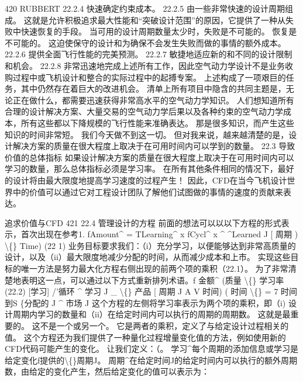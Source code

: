 \documentclass[UTF8,11pt,a4paper,openany,fontset=fandol]{ctexbook}
\begin{document}
420 RUBBERT 22.2.4 快速确定约束成本。 22.2.5 由一些非常快速的设计周期组成。 这就是允许积极追求最大性能和“突破设计范围”的原因，它提供了一种从失败中快速恢复的手段。 当可用的设计周期数量太少时，失败是不可能的。 恢复是不可能的。 这迫使保守的设计和为确保不会发生失败而做的事情的额外成本。 22.2.6 提供全面飞行性能的完美预测。 22.2.7 敏捷地适应新的和不同的设计限制和机会。 22.2.8 非常迅速地完成上述所有工作，因此空气动力学设计不是业务收购过程中或飞机设计和整合的实际过程中的起搏专案。 上述构成了一项艰巨的任务，其中仍然存在着巨大的改进机会。 清单上所有项目中隐含的共同主题是，无论正在做什么，都需要迅速获得非常高水平的空气动力学知识。 人们想知道所有合理的设计解决方案、大量交易的空气动力学后果以及各种约束的空气动力学成本，所有这些都以下降规模的飞行性能来准确表达。 那是很多知识，而产生这些知识的时间非常短。 我们今天做不到这一切。 但对我来说，越来越清楚的是，设计解决方案的质量在很大程度上取决于在可用时间内可以学到的数量。 22.3 导致价值的总体指标 如果设计解决方案的质量在很大程度上取决于在可用时间内可以学习的数量，那么总体指标必须是学习率。 在所有其他条件相同的情况下，最好的设计将由最大限度地提高学习速度的过程产生！ 因此，CFD在当今飞机设计世界中的价值可以通过它对工程设计团队了解他们试图做的事情的速度的贡献来表达。

追求价值与CFD 421 22.4 管理设计的方程 前面的想法可以以以下方程的形式表示，首次出现在参考1. fAmount\textasciicircum{} = TLearning\textasciicircum{} x fCycl\textasciicircum{} x \textasciicircum{} \textasciicircum{}Learned J [ 周期 ) \textbackslash\{\} Time) (22 1) 业务目标要求我们：（i）充分学习，以便能够达到非常高质量的设计，以及（ii）最大限度地减少分配的时间，从而减少成本和上市。 实现这些目标的唯一方法是努力最大化方程右侧出现的前两个项的乘积（22.1）。 为了非常清楚地表明这一点，可以通过以下方式重新排列术语。f 金额\textasciicircum{} (质量 \textbackslash\{\} 学习率 (22.2) [学习] /'循环 \textasciicircum{} 学习 J \_ \textbackslash\{\} 产品 [ 周期 J A V 时间) ( 时间 \textbackslash\{\} = 7 时间到S \{分配的 J \textasciicircum{} 市场 J 这个方程的左侧将学习率表示为两个项的乘积，即（i) 设计周期内学习的数量和（ii）在给定时间内可以执行的周期的周期数。 这就是最重要的。 这不是一个或另一个。 它是两者的乘积，定义了与给定设计过程相关的值。 这个方程还为我们提供了一种量化过程增量变化值的方法，例如使用新的CFD代码可能产生的变化。 让我们定义：（。 学习\textasciicircum{}每个周期的添加信息或学习是给定变化f提供的\textbackslash\{\}周期J。 周期\textasciicircum{}在给定时间J的给定时间内可以执行的额外周期数，由给定的变化产生，然后给定变化的值可以表示为：
\end{document}
